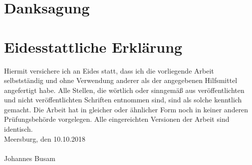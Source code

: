 \newpage

\section*{Danksagung}




\newpage

\section*{Eidesstattliche Erklärung}

Hiermit versichere ich an Eides statt, dass ich die vorliegende Arbeit selbstständig und
ohne Verwendung anderer als der angegebenen Hilfsmittel angefertigt habe. Alle Stellen,
die wörtlich oder sinngemäß aus veröffentlichten und nicht veröffentlichten Schriften
entnommen sind, sind als solche kenntlich gemacht. Die Arbeit hat in gleicher oder
ähnlicher Form noch in keiner anderen Prüfungsbehörde vorgelegen. Alle eingereichten
Versionen der Arbeit sind identisch.\\
\newline
\noindent
Meersburg, den 10.10.2018 \\
\vspace{1.5cm} \\
Johannes Busam\newline

\newpage
